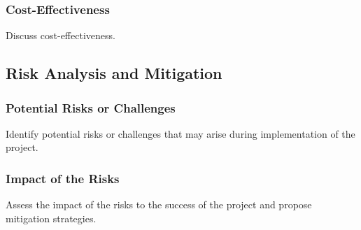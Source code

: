 \documentclass[12pt]{article}
\newenvironment{subsubs}{\adjustwidth{4em}{0pt}}{\endadjustwidth}
\begin{document}
\subsubsection{Cost-Effectiveness}
\begin{subsubs}

Discuss cost-effectiveness.

\end{subsubs}

\subsection{Risk Analysis and Mitigation}
\subsubsection{Potential Risks or Challenges}
\begin{subsubs}

Identify potential risks or challenges that may arise during implementation of the project.

\end{subsubs}

\subsubsection{Impact of the Risks}
\begin{subsubs}

Assess the impact of the risks to the success of the project and propose mitigation strategies.
    
\end{subsubs}

\newpage


\end{document}
